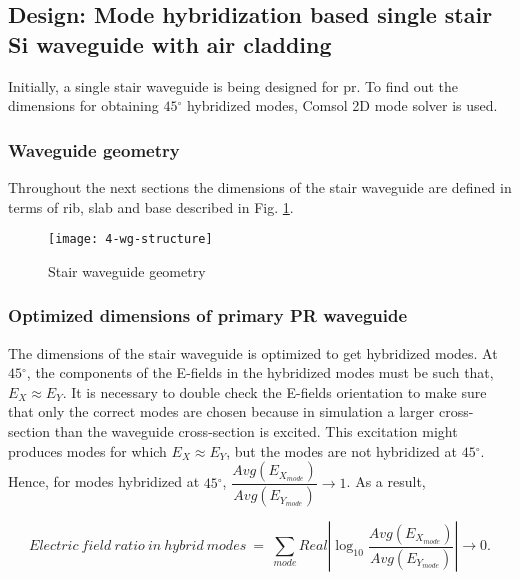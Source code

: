 \documentclass[../report.tex]{subfiles}
\begin{document}
		\subsection{Design: Mode hybridization based single stair Si waveguide with air cladding}
Initially, a single stair waveguide is being designed for \gls{pr}. To find out the dimensions for obtaining $45{^\circ}$ hybridized modes, Comsol 2D mode solver is used. 

\subsubsection{Waveguide geometry}
Throughout the next sections the dimensions of the stair waveguide are defined in terms of rib, slab and base described in Fig. \ref{fig:4_wg_structure}.   

\begin{figure}[H] %
	\centering
	\texttt{[image: 4-wg-structure]}
	\caption{Stair waveguide geometry}
	\label{fig:4_wg_structure}
\end{figure}


\subsubsection{Optimized dimensions of primary PR waveguide}
The dimensions of the stair waveguide is optimized to get hybridized modes. At $45{^\circ}$, the components of the E-fields in the hybridized modes must be such that, $E_X \approx E_Y$. It is necessary to double check the E-fields orientation to make sure that only the correct modes are chosen because in simulation a larger cross-section than the waveguide cross-section is excited. This excitation might produces modes for which $E_X \approx E_Y$, but the modes are not hybridized at $45{^\circ}$. Hence, for modes hybridized at $45{^\circ}$, $\dfrac {Avg(E_{X_{mode}})} {Avg(E_{Y_{mode}})} \rightarrow 1$. As a result, 

\begin{equation}\label{eq:wg_dim_eq}
Electric ~ field ~ ratio ~ in ~ hybrid ~ modes ~ = ~ \sum _{mode}Real\left| \log _{10}\dfrac {Avg(E_{X_{mode}})} {Avg(E_{Y_{mode}})}\right| \rightarrow 0. 
\end{equation}
\end{document}
